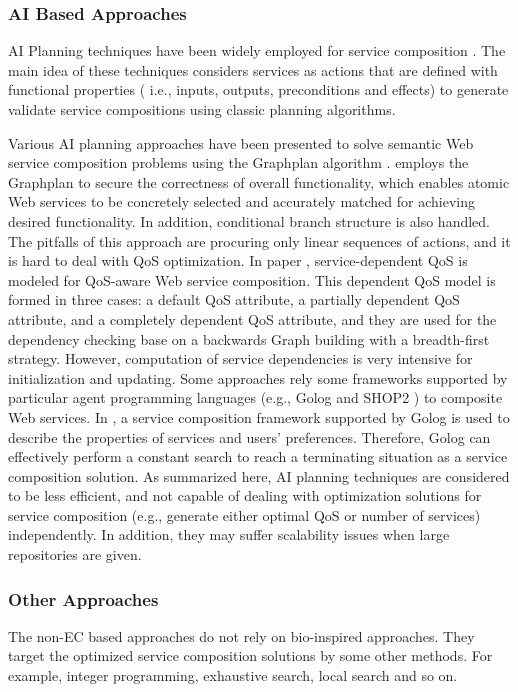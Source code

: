 \subsubsection{AI Based Approaches}

AI Planning techniques have been widely employed for service composition \cite{markou2015non,peer2005web}. The main idea of these techniques considers services as actions that are defined with functional properties ( i.e., inputs, outputs, preconditions and effects) to generate validate service compositions using classic planning algorithms. 

Various AI planning approaches \cite{feng2013dynamic,huang2009effective,rao2006mixed,wang2013genetic, wang2014automated} have been presented to solve semantic Web service composition problems using the Graphplan algorithm \cite{blum1997fast}. \cite{wang2014automated} employs the Graphplan to secure the correctness of overall functionality, which enables atomic Web services to be concretely selected and accurately matched for achieving desired functionality. In addition, conditional branch structure is also handled. The pitfalls of this approach are procuring only linear sequences of actions, and it is hard to deal with QoS optimization. In paper \cite{feng2013dynamic}, service-dependent QoS is modeled for QoS-aware Web service composition. This dependent QoS model is formed in three cases: a default QoS attribute, a partially dependent QoS attribute, and a completely dependent QoS attribute, and they are used for the dependency checking base on a backwards Graph building with a breadth-first strategy. However, computation of service dependencies is very intensive for initialization and updating. Some approaches \cite{lecue2007making,sohrabi2009Web} rely some frameworks supported by particular agent programming languages (e.g., Golog \cite{sohrabi2009Web}  and SHOP2 \cite{sirin2004htn}) to composite Web services. In \cite{sohrabi2009Web}, a service composition framework supported by Golog is used to describe the properties of services and users' preferences. Therefore, Golog can effectively perform a constant search to reach a terminating situation as a service composition solution. As summarized here, AI planning techniques are considered to be less efficient, and not capable of dealing with optimization solutions for service composition (e.g., generate either optimal QoS or number of services) independently. In addition, they may suffer scalability issues when large repositories are given. 

\subsubsection{Other Approaches}
The non-EC based approaches do not rely on bio-inspired approaches. They target the optimized service composition solutions by some other methods. For example, integer programming, exhaustive search, local search and so on.

